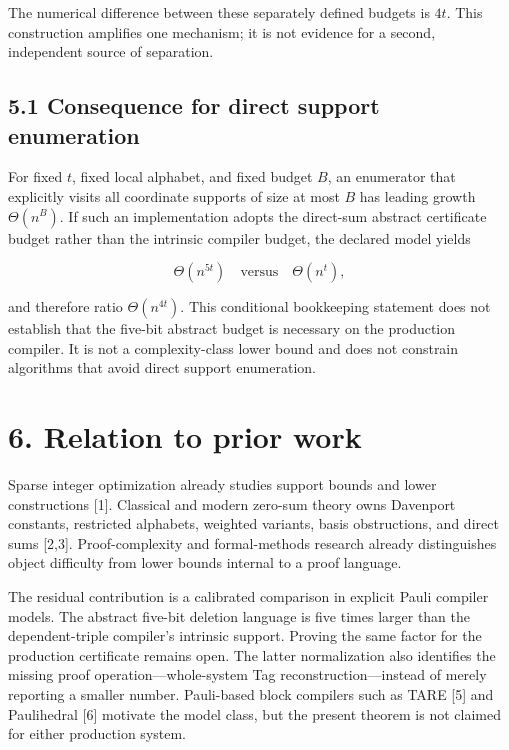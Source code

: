 \documentclass[
  11pt,
]{article}
\begin{document}
The numerical difference between these separately defined budgets is
\(4t\). This construction amplifies one mechanism; it is not evidence
for a second, independent source of separation.

\hypertarget{consequence-for-direct-support-enumeration}{%
\subsection{5.1 Consequence for direct support
enumeration}\label{consequence-for-direct-support-enumeration}}

For fixed \(t\), fixed local alphabet, and fixed budget \(B\), an
enumerator that explicitly visits all coordinate supports of size at
most \(B\) has leading growth \(\Theta(n^B)\). If such an implementation
adopts the direct-sum abstract certificate budget rather than the
intrinsic compiler budget, the declared model yields

\[
\Theta(n^{5t})\quad\text{versus}\quad\Theta(n^t),
\]

and therefore ratio \(\Theta(n^{4t})\). This conditional bookkeeping
statement does not establish that the five-bit abstract budget is
necessary on the production compiler. It is not a complexity-class lower
bound and does not constrain algorithms that avoid direct support
enumeration.

\hypertarget{relation-to-prior-work}{%
\section{6. Relation to prior work}\label{relation-to-prior-work}}

Sparse integer optimization already studies support bounds and lower
constructions {[}1{]}. Classical and modern zero-sum theory owns
Davenport constants, restricted alphabets, weighted variants, basis
obstructions, and direct sums {[}2,3{]}. Proof-complexity and
formal-methods research already distinguishes object difficulty from
lower bounds internal to a proof language.

The residual contribution is a calibrated comparison in explicit Pauli
compiler models. The abstract five-bit deletion language is five times
larger than the dependent-triple compiler's intrinsic support. Proving
the same factor for the production certificate remains open. The latter
normalization also identifies the missing proof operation---whole-system
Tag reconstruction---instead of merely reporting a smaller number.
Pauli-based block compilers such as TARE {[}5{]} and Paulihedral {[}6{]}
motivate the model class, but the present theorem is not claimed for
either production system.
\end{document}
